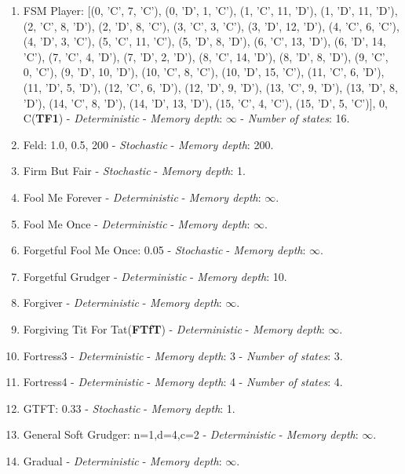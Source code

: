 \documentclass[10pt,letterpaper]{article}
\begin{document}
\begin{enumerate}
\item FSM Player: [(0, 'C', 7, 'C'), (0, 'D', 1, 'C'), (1, 'C', 11, 'D'), (1, 'D', 11, 'D'), (2, 'C', 8, 'D'), (2, 'D', 8, 'C'), (3, 'C', 3, 'C'), (3, 'D', 12, 'D'), (4, 'C', 6, 'C'), (4, 'D', 3, 'C'), (5, 'C', 11, 'C'), (5, 'D', 8, 'D'), (6, 'C', 13, 'D'), (6, 'D', 14, 'C'), (7, 'C', 4, 'D'), (7, 'D', 2, 'D'), (8, 'C', 14, 'D'), (8, 'D', 8, 'D'), (9, 'C', 0, 'C'), (9, 'D', 10, 'D'), (10, 'C', 8, 'C'), (10, 'D', 15, 'C'), (11, 'C', 6, 'D'), (11, 'D', 5, 'D'), (12, 'C', 6, 'D'), (12, 'D', 9, 'D'), (13, 'C', 9, 'D'), (13, 'D', 8, 'D'), (14, 'C', 8, 'D'), (14, 'D', 13, 'D'), (15, 'C', 4, 'C'), (15, 'D', 5, 'C')], 0, C(\textbf{TF1}) - \textit{Deterministic} - \textit{Memory depth}: \(\infty\) - \textit{Number of states}: 16.
\item Feld: 1.0, 0.5, 200 - \textit{Stochastic} - \textit{Memory depth}: 200. \cite{Axelrod1980a}
\item Firm But Fair - \textit{Stochastic} - \textit{Memory depth}: 1. \cite{Frean1994}
\item Fool Me Forever - \textit{Deterministic} - \textit{Memory depth}: \(\infty\). \cite{axelrodproject}
\item Fool Me Once - \textit{Deterministic} - \textit{Memory depth}: \(\infty\). \cite{axelrodproject}
\item Forgetful Fool Me Once: 0.05 - \textit{Stochastic} - \textit{Memory depth}: \(\infty\). \cite{axelrodproject}
\item Forgetful Grudger - \textit{Deterministic} - \textit{Memory depth}: 10. \cite{axelrodproject}
\item Forgiver - \textit{Deterministic} - \textit{Memory depth}: \(\infty\). \cite{axelrodproject}
\item Forgiving Tit For Tat(\textbf{FTfT}) - \textit{Deterministic} - \textit{Memory depth}: \(\infty\). \cite{axelrodproject}
\item Fortress3 - \textit{Deterministic} - \textit{Memory depth}: 3 - \textit{Number of states}: 3. \cite{Ashlock2006}
\item Fortress4 - \textit{Deterministic} - \textit{Memory depth}: 4 - \textit{Number of states}: 4. \cite{Ashlock2006}
\item GTFT: 0.33 - \textit{Stochastic} - \textit{Memory depth}: 1. \cite{Gaudesi2016, Nowak1993}
\item General Soft Grudger: n=1,d=4,c=2 - \textit{Deterministic} - \textit{Memory depth}: \(\infty\). \cite{axelrodproject}
\item Gradual - \textit{Deterministic} - \textit{Memory depth}: \(\infty\). \cite{Beaufils1997}

\end{enumerate}
\end{document}
